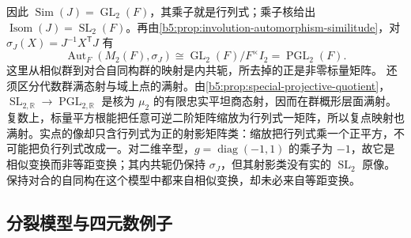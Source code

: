 因此 \(\operatorname{Sim}(J)=\operatorname{GL}_2(F)\)，其乘子就是行列式；乘子核给出 \(\operatorname{Isom}(J)=\operatorname{SL}_2(F)\)。再由\cref{b5:prop:involution-automorphism-similitude}，对 \(\sigma_J(X)=J^{-1}X^{\mathsf T}J\) 有
\[
	\operatorname{Aut}_F(M_2(F),\sigma_J) \cong\operatorname{GL}_2(F)/F^\times I_2 =\operatorname{PGL}_2(F).
\]
这里从相似群到对合自同构群的映射是内共轭，所去掉的正是非零标量矩阵。
\ProseParagraphBreak
还须区分代数群满态射与域上点的满射。由\cref{b5:prop:special-projective-quotient}， \(\operatorname{SL}_{2,\mathbb R}\to\operatorname{PGL}_{2,\mathbb R}\) 是核为 \(\mu_2\) 的有限忠实平坦商态射，因而在群概形层面满射。复数上，标量平方根能把任意可逆二阶矩阵缩放为行列式一矩阵，所以复点映射也满射。实点的像却只含行列式为正的射影矩阵类：缩放把行列式乘一个正平方，不可能把负行列式改成一。对二维辛型，\(g=\operatorname{diag}(-1,1)\) 的乘子为 \(-1\)，故它是相似变换而非等距变换；其内共轭仍保持 \(\sigma_J\)，但其射影类没有实的 \(\operatorname{SL}_2\) 原像。保持对合的自同构在这个模型中都来自相似变换，却未必来自等距变换。

\subsection{分裂模型与四元数例子}
\label{b5:subsec:2105:03}

